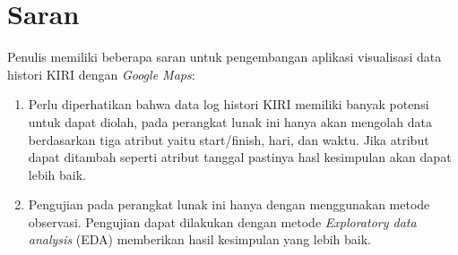 \section{Saran}
Penulis memiliki beberapa saran untuk pengembangan aplikasi visualisasi data histori KIRI dengan \textit{Google Maps}:
\begin{enumerate}
	\item Perlu diperhatikan bahwa data log histori KIRI memiliki banyak potensi untuk dapat diolah, pada perangkat lunak ini hanya akan mengolah data berdasarkan tiga atribut yaitu start/finish, hari, dan waktu. Jika atribut dapat ditambah seperti atribut tanggal pastinya hasl kesimpulan akan dapat lebih baik. 
	
	\item Pengujian pada perangkat lunak ini hanya dengan menggunakan metode observasi. Pengujian dapat dilakukan dengan metode \textit{Exploratory data analysis} (EDA) memberikan hasil kesimpulan yang lebih baik.
\end{enumerate}